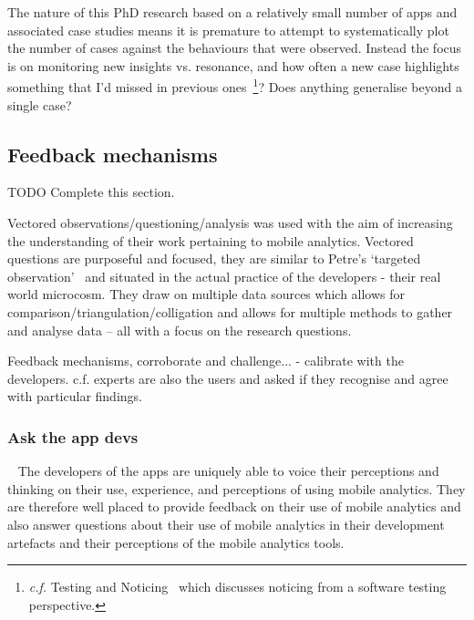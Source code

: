 The nature of this PhD research based on a relatively small number of apps and associated case studies means it is premature to attempt to systematically plot the number of cases against the behaviours that were observed. Instead the focus is on monitoring 
new insights vs. resonance, and how often a new case highlights something that I'd missed in previous ones~\footnote{\textit{c.f.} Testing and Noticing~\citep{bolton2009_testing_and_noticing} which discusses noticing from a software testing perspective.}? Does anything generalise beyond a single case? %

\subsection{Feedback mechanisms}
TODO Complete this section.

\label{method-vectored-questions}
Vectored observations/questioning/analysis was used with the aim of increasing the understanding of their work pertaining to mobile analytics. Vectored questions are purposeful and focused, they are similar to Petre's `targeted observation'~\citep[p.234]{petre2009_insights_from_expert_software_design_practice} and situated in the actual practice of the developers - their real world microcosm. They draw on multiple data sources which allows for comparison/triangulation/colligation and allows for multiple methods to gather and analyse data -- all with a focus on the research questions.

Feedback mechanisms, corroborate and challenge... - calibrate with the developers. c.f. experts are also the users and asked if they recognise and agree with particular findings. 


\subsubsection{Ask the app devs}~\label{section-ask-the-app-devs-research-method}
The developers of the apps are uniquely able to voice their perceptions and thinking on their use, experience, and perceptions of using mobile analytics. They are therefore well placed to provide feedback on their use of mobile analytics and also answer questions about their use of mobile analytics in their development artefacts and their perceptions of the mobile analytics tools.

